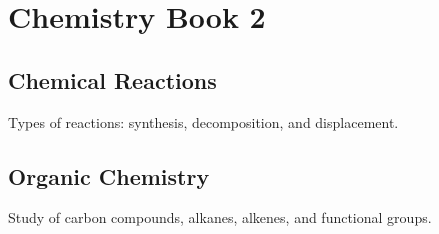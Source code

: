 \chapter{Chemistry Book 2}

\section{Chemical Reactions}
Types of reactions: synthesis, decomposition, and displacement.

\section{Organic Chemistry}
Study of carbon compounds, alkanes, alkenes, and functional groups.
